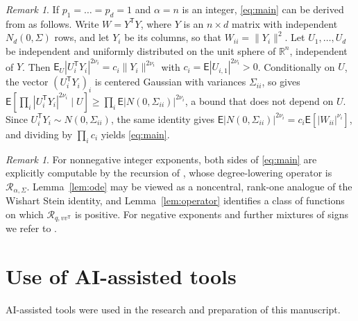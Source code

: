 \documentclass{amsart}
\theoremstyle{definition}
\theoremstyle{remark}
\newtheorem{remark}[theorem]{Remark}
\numberwithin{equation}{section}
\newcommand{\R}{\mathbb{R}}
\newcommand{\E}{\mathsf{E}}
\newcommand{\Rop}{\mathcal{R}}
\begin{document}
\begin{remark}\label{rem:scalar}
If $p_1=\dots=p_d=1$ and $\alpha=n$ is an integer, \eqref{eq:main} can be derived from \cite[Theorem~1]{OG26} as follows. Write $W=Y^{\mathsf T}Y$, where $Y$ is an $n\times d$ matrix with independent $N_d(0,\Sigma)$ rows, and let $Y_i$ be its columns, so that $W_{ii}=\|Y_i\|^2$. Let $U_1,\dots,U_d$ be independent and uniformly distributed on the unit sphere of $\R^n$, independent of $Y$. Then $\E_U|U_i^{\mathsf T}Y_i|^{2\nu_i}=c_i\|Y_i\|^{2\nu_i}$ with $c_i=\E|U_{i,1}|^{2\nu_i}>0$. Conditionally on $U$, the vector $(U_i^{\mathsf T}Y_i)_i$ is centered Gaussian with variances $\Sigma_{ii}$, so \cite[Theorem~1]{OG26} gives $\E[\prod_i|U_i^{\mathsf T}Y_i|^{2\nu_i}\mid U]\ge\prod_i\E|N(0,\Sigma_{ii})|^{2\nu_i}$, a bound that does not depend on $U$. Since $U_i^{\mathsf T}Y_i\sim N(0,\Sigma_{ii})$, the same identity gives $\E|N(0,\Sigma_{ii})|^{2\nu_i}=c_i\E[|W_{ii}|^{\nu_i}]$, and dividing by $\prod_ic_i$ yields \eqref{eq:main}.
\end{remark}

\begin{remark}
For nonnegative integer exponents, both sides of \eqref{eq:main} are explicitly computable by the recursion of \cite{GO26}, whose degree-lowering operator is $\Rop_{\alpha,\Sigma}$. Lemma~\ref{lem:ode} may be viewed as a noncentral, rank-one analogue of the Wishart Stein identity, and Lemma~\ref{lem:operator} identifies a class of functions on which $\Rop_{q,vv^{\mathsf T}}$ is positive. For negative exponents and further mixtures of signs we refer to \cite{GOR24a}.
\end{remark}

\section*{Use of AI-assisted tools}
AI-assisted tools were used in the research and preparation of this manuscript.
\end{document}
